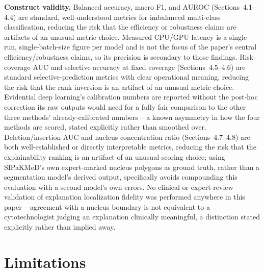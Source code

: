\documentclass[runningheads]{llncs}
\begin{document}
\textbf{Construct validity.} Balanced accuracy, macro F1, and AUROC
(Sections~4.1--4.4) are standard, well-understood metrics for imbalanced
multi-class classification, reducing the risk that the efficiency or
robustness claims are artifacts of an unusual metric choice. Measured
CPU/GPU latency is a single-run, single-batch-size figure per model and
is not the focus of the paper's central efficiency/robustness claims, so
its precision is secondary to those findings. Risk-coverage AUC and
selective accuracy at fixed coverage (Sections~4.5--4.6) are standard
selective-prediction metrics with clear operational meaning, reducing the
risk that the rank inversion is an artifact of an unusual metric choice.
Evidential deep learning's calibration numbers are reported without the
post-hoc correction its raw outputs would need for a fully fair comparison
to the other three methods' already-calibrated numbers -- a known
asymmetry in how the four methods are scored, stated explicitly rather
than smoothed over. Deletion/insertion AUC and nucleus concentration
ratio (Sections~4.7--4.8) are both well-established or directly
interpretable metrics, reducing the risk that the explainability ranking
is an artifact of an unusual scoring choice; using SIPaKMeD's own
expert-marked nucleus polygons as ground truth, rather than a
segmentation model's derived output, specifically avoids compounding this
evaluation with a second model's own errors. No clinical or expert-review
validation of explanation localization fidelity was performed anywhere in
this paper -- agreement with a nucleus boundary is not equivalent to a
cytotechnologist judging an explanation clinically meaningful, a
distinction stated explicitly rather than implied away.

\section{Limitations}
\end{document}
